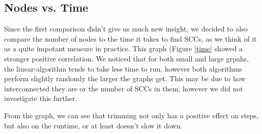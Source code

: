 \documentclass[../master/master.tex]{subfiles}
\begin{document}
\subsection{Nodes vs. Time}
Since the first comparison didn't give us much new insight, we decided to also compare the number of nodes to the time it takes to find SCCs, as we think of it as a quite impotant measure in practice. This graph (Figure \ref{time}  showed a stronger positive correlation. We noticed that for both small and large grpahs, the linear-algorithm tends to take less time to run, however both algorithms perform slightly randomly the larger the graphs get. This may be due to how interconnected they are or the number of SCCs in them, however we did not investigate this further.

From the graph, we can see that trimming not only has a positive effect on steps, but also on the runtime, or at least doesn't slow it down.
\end{document}
